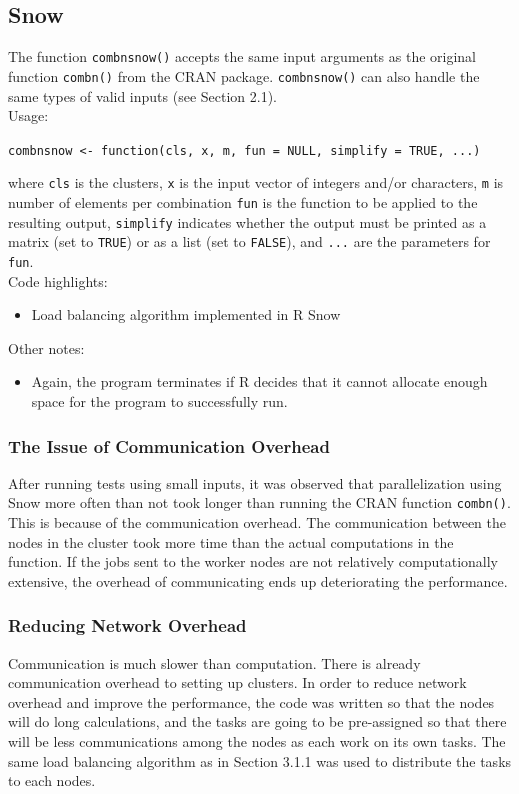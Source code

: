 \subsection{Snow}

The function \texttt{combnsnow()} accepts the same input arguments as the original function \texttt{combn()} from the CRAN package. \texttt{combnsnow()} can also handle the same types of valid inputs (see Section 2.1).\\
\null
Usage:\\
\null

\texttt{combnsnow <- function(cls, x, m, fun = NULL, simplify = TRUE, ...)}\\
\null

where \texttt{cls} is the clusters, \texttt{x} is the input vector of integers and/or characters, \texttt{m} is number of elements per combination
\texttt{fun} is the function to be applied to the resulting output, \texttt{simplify} indicates whether the output must be printed as a matrix (set to \texttt{TRUE}) or as a list (set to \texttt{FALSE}), and \texttt{...} are the parameters for \texttt{fun}.\\

\null
Code highlights:\\
\begin{itemize}
\item Load balancing algorithm implemented in R Snow
\end{itemize}
Other notes:
\begin{itemize}
\item Again, the program terminates if R decides that it cannot allocate enough space for the program to successfully run.
\end{itemize}

\subsubsection{The Issue of Communication Overhead}
After running tests using small inputs, it was observed that parallelization using Snow more often than not took longer than running the CRAN function \texttt{combn()}. This is because of the communication overhead. The communication between the nodes in the cluster took more time than the actual computations in the function. If the jobs sent to the worker nodes are not relatively computationally extensive, the overhead of communicating ends up deteriorating the performance.

\subsubsection{Reducing Network Overhead}
Communication is much slower than computation. There is already communication overhead to setting up clusters. In order to reduce network overhead and improve the performance, the code was written so that the nodes will do long calculations, and the tasks are going to be pre-assigned so that there will be less communications among the nodes as each work on its own tasks. The same load balancing algorithm as in Section 3.1.1 was used to distribute the tasks to each nodes.

